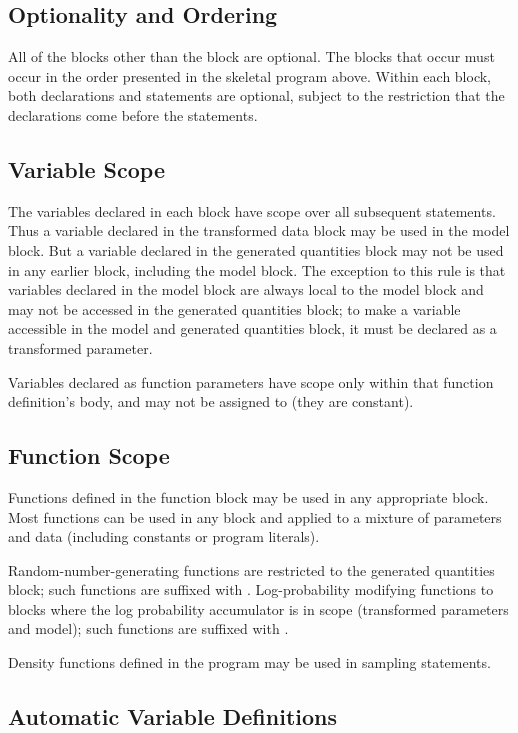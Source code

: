 \subsection{Optionality and Ordering}

All of the blocks other than the  block are optional.  The
blocks that occur must occur in the order presented in the skeletal
program above.  Within each block, both declarations and statements
are optional, subject to the restriction that the declarations come
before the statements.

\subsection{Variable Scope}

The variables declared in each block have scope over all subsequent
statements.  Thus a variable declared in the transformed data block
may be used in the model block.  But a variable declared in the
generated quantities block may not be used in any earlier block,
including the model block.  The exception to this rule is that
variables declared in the model block are always local to the model
block and may not be accessed in the generated quantities block; to
make a variable accessible in the model and generated quantities
block, it must be declared as a transformed parameter.

Variables declared as function parameters have scope only within that
function definition's body, and may not be assigned to (they are
constant).

\subsection{Function Scope}

Functions defined in the function block may be used in any appropriate
block.  Most functions can be used in any block and applied to a
mixture of parameters and data (including constants or program
literals).  

Random-number-generating functions are restricted to the generated
quantities block; such functions are suffixed with .
Log-probability modifying functions to blocks where the log
probability accumulator is in scope (transformed parameters and
model); such functions are suffixed with .

Density functions defined in the program may be used in sampling
statements.  

\subsection{Automatic Variable Definitions}

